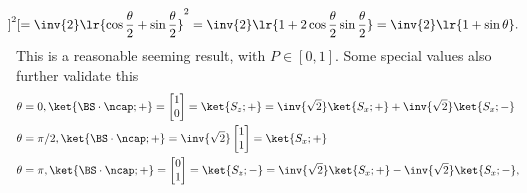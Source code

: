 {\begin{dmath}
{\begin{bmatrix}
\end{bmatrix}
}^2
=
\inv{2}
\lr{
\cos\frac{\theta}{2} +
\sin\frac{\theta}{2}
}^2
=
\inv{2}
\lr{ 1 + 2 \cos\frac{\theta}{2} \sin\frac{\theta}{2} }
=
\inv{2}
\lr{ 1 + \sin\theta }.
\end{dmath}
%
This is a reasonable seeming result, with \( P \in [0, 1] \).  Some special values also further validate this
%
\begin{equation}\label{eqn:moreBraKetProblems:760}
\begin{aligned}
\theta &= 0, \ket{\BS \cdot \ncap ; + } =
\begin{bmatrix}
1 \\
0
\end{bmatrix}
=
\ket{S_z ; +}
=
\inv{\sqrt{2}} \ket{S_x;+}
+\inv{\sqrt{2}} \ket{S_x;-}
\\
\theta &= \pi/2, \ket{\BS \cdot \ncap ; + } =
\inv{\sqrt{2}}
\begin{bmatrix}
1 \\
1
\end{bmatrix}
=
\ket{S_x ; +}
\\
\theta &= \pi, \ket{\BS \cdot \ncap ; + } =
\begin{bmatrix}
0 \\
1
\end{bmatrix}
=
\ket{S_z ; -}
=
\inv{\sqrt{2}} \ket{S_x;+}
-\inv{\sqrt{2}} \ket{S_x;-},
\end{aligned}
\end{equation}

}
